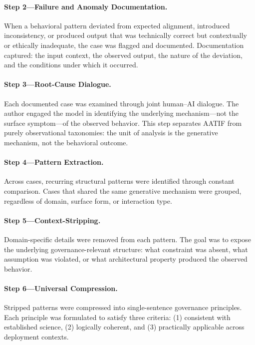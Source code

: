 \documentclass[11pt,a4paper]{article}
\begin{document}
\paragraph{Step 2---Failure and Anomaly Documentation.}
When a behavioral pattern deviated from expected alignment, introduced inconsistency, or produced output that was technically correct but contextually or ethically inadequate, the case was flagged and documented. Documentation captured: the input context, the observed output, the nature of the deviation, and the conditions under which it occurred.

\paragraph{Step 3---Root-Cause Dialogue.}
Each documented case was examined through joint human--AI dialogue. The author engaged the model in identifying the underlying mechanism---not the surface symptom---of the observed behavior. This step separates AATIF from purely observational taxonomies: the unit of analysis is the generative mechanism, not the behavioral outcome.

\paragraph{Step 4---Pattern Extraction.}
Across cases, recurring structural patterns were identified through constant comparison. Cases that shared the same generative mechanism were grouped, regardless of domain, surface form, or interaction type.

\paragraph{Step 5---Context-Stripping.}
Domain-specific details were removed from each pattern. The goal was to expose the underlying governance-relevant structure: what constraint was absent, what assumption was violated, or what architectural property produced the observed behavior.

\paragraph{Step 6---Universal Compression.}
Stripped patterns were compressed into single-sentence governance principles. Each principle was formulated to satisfy three criteria: (1) consistent with established science, (2) logically coherent, and (3) practically applicable across deployment contexts.
\end{document}
